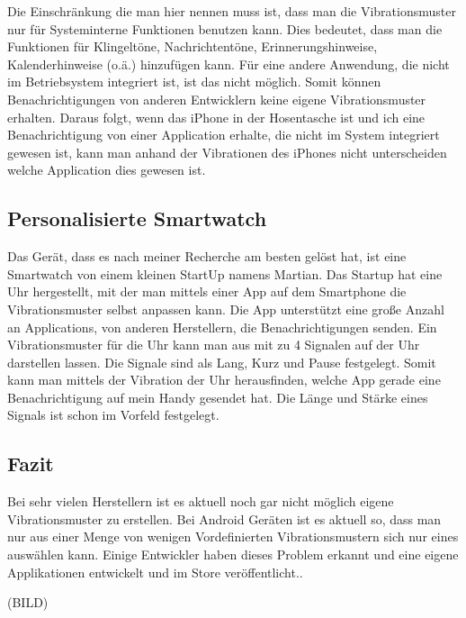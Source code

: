 Die Einschr{\"a}nkung die man hier nennen muss ist, dass man die Vibrationsmuster nur f{\"u}r Systeminterne Funktionen benutzen kann. Dies bedeutet, dass man die Funktionen f{\"u}r Klingelt{\"o}ne, Nachrichtent{\"o}ne, Erinnerungshinweise, Kalenderhinweise (o.{\"a}.) hinzuf{\"u}gen kann. F{\"u}r eine andere Anwendung, die nicht im Betriebsystem integriert ist, ist das nicht m{\"o}glich. Somit k{\"o}nnen Benachrichtigungen von anderen Entwicklern keine eigene Vibrationsmuster erhalten. Daraus folgt, wenn das iPhone in der Hosentasche ist und ich eine Benachrichtigung von einer Application erhalte, die nicht im System integriert gewesen ist, kann man anhand der Vibrationen des iPhones nicht unterscheiden welche Application dies gewesen ist.

\subsection{Personalisierte Smartwatch}
\label{ch:Grundlagen:sec:RelatedWork:subsec:PersonalisierteSmartwatch}


Das Ger{\"a}t, dass es nach meiner Recherche am besten gel{\"o}st hat, ist eine Smartwatch von einem kleinen StartUp namens Martian. 
Das Startup hat eine Uhr hergestellt, mit der man mittels einer App auf dem Smartphone die Vibrationsmuster selbst anpassen kann. 
Die App unterst{\"u}tzt eine gro{\ss}e Anzahl an Applications, von anderen Herstellern, die Benachrichtigungen senden. Ein Vibrationsmuster f{\"u}r die Uhr kann man aus mit zu 4 Signalen auf der Uhr darstellen lassen. Die Signale sind als Lang, Kurz und Pause festgelegt. 
Somit kann man mittels der Vibration der Uhr herausfinden, welche App gerade eine Benachrichtigung auf mein Handy gesendet hat. Die L{\"a}nge und St{\"a}rke eines Signals ist schon im Vorfeld festgelegt.

\subsection{Fazit}
\label{ch:Grundlagen:sec:RelatedWork:subsec:PersonalisierteSmartwatch}
Bei sehr vielen Herstellern ist es aktuell noch gar nicht m{\"o}glich eigene Vibrationsmuster zu erstellen. Bei Android Ger{\"a}ten ist es aktuell so, dass man nur aus einer Menge von wenigen Vordefinierten Vibrationsmustern sich nur eines ausw{\"a}hlen kann. Einige Entwickler haben dieses Problem erkannt und eine eigene Applikationen entwickelt und im Store ver{\"o}ffentlicht..

(BILD)

